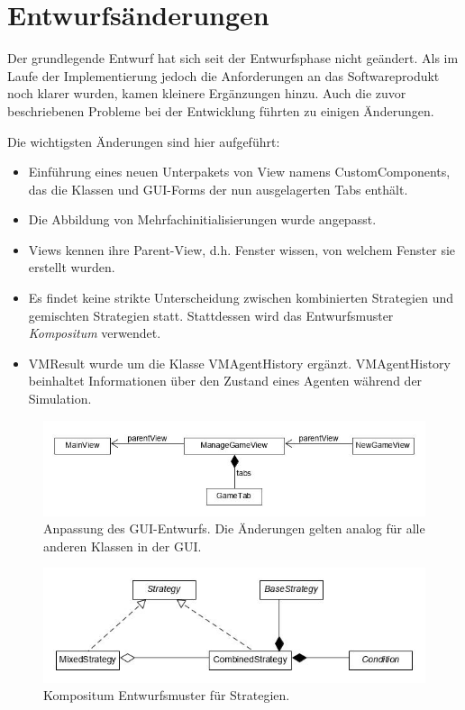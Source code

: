\section{Entwurfsänderungen}

Der grundlegende Entwurf hat sich seit der Entwurfsphase nicht geändert. Als im Laufe der Implementierung jedoch die Anforderungen an das Softwareprodukt noch klarer wurden, kamen kleinere Ergänzungen hinzu. Auch die zuvor beschriebenen Probleme bei der Entwicklung führten zu einigen Änderungen.

Die wichtigsten Änderungen sind hier aufgeführt:

\begin{itemize}
\item Einführung eines neuen Unterpakets von View namens CustomComponents, das die Klassen und GUI-Forms der nun ausgelagerten Tabs enthält.

\item Die Abbildung von Mehrfachinitialisierungen wurde angepasst.

\item Views kennen ihre Parent-View, d.h. Fenster wissen, von welchem Fenster sie erstellt wurden.

\item Es findet keine strikte Unterscheidung zwischen kombinierten Strategien und gemischten Strategien statt. Stattdessen wird das Entwurfsmuster \emph{Kompositum} verwendet.

\item VMResult wurde um die Klasse VMAgentHistory ergänzt. VMAgentHistory beinhaltet Informationen über den Zustand eines Agenten während der Simulation. 

\end{itemize}

\begin{figure}[H]
	\centering
	\includegraphics[scale=0.5]{pse_update1.jpg}
	\caption{Anpassung des GUI-Entwurfs. Die Änderungen gelten analog für alle anderen Klassen in der GUI.}
\end{figure}

\begin{figure}[H]
	\centering
	\includegraphics[scale=0.5]{pse_update2.jpg}
	\caption{Kompositum Entwurfsmuster für Strategien.}
\end{figure}